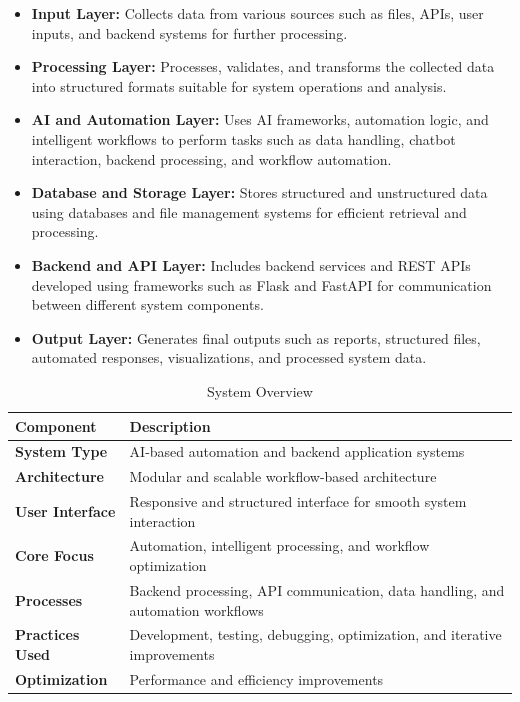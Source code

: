 \documentclass[12pt,a4paper]{report}
\begin{document}
\begin{itemize}[leftmargin=1.5cm]
    \item \textbf{Input Layer:} Collects data from various sources such as files, APIs, user inputs, and backend systems for further processing.
    \item \textbf{Processing Layer:} Processes, validates, and transforms the collected data into structured formats suitable for system operations and analysis.
    \item \textbf{AI and Automation Layer:} Uses AI frameworks, automation logic, and intelligent workflows to perform tasks such as data handling, chatbot interaction, backend processing, and workflow automation.
    \item \textbf{Database and Storage Layer:} Stores structured and unstructured data using databases and file management systems for efficient retrieval and processing.
    \item \textbf{Backend and API Layer:} Includes backend services and REST APIs developed using frameworks such as Flask and FastAPI for communication between different system components.
    \item \textbf{Output Layer:} Generates final outputs such as reports, structured files, automated responses, visualizations, and processed system data.
\end{itemize}

\begin{table}[H]
\centering
\caption{System Overview}
\begin{tabular}{>{\bfseries}p{4cm} p{9cm}}
\toprule
\textbf{Component} & \textbf{Description} \\
\midrule
System Type & AI-based automation and backend application systems \\
Architecture & Modular and scalable workflow-based architecture \\
User Interface & Responsive and structured interface for smooth system interaction \\
Core Focus & Automation, intelligent processing, and workflow optimization \\
Processes & Backend processing, API communication, data handling, and automation workflows \\
Practices Used & Development, testing, debugging, optimization, and iterative improvements \\
Optimization & Performance and efficiency improvements \\
\bottomrule
\end{tabular}
\label{tab:sysoverview}
\end{table}
\end{document}
